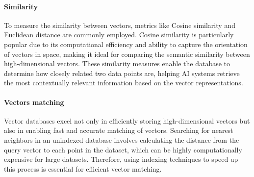 \paragraph*{Similarity}
To measure the similarity between vectors, metrics like Cosine similarity and Euclidean distance are commonly employed.
Cosine similarity is particularly popular due to its computational efficiency and ability to capture the orientation of vectors in space, making it ideal for comparing the semantic similarity between high-dimensional vectors. 
These similarity measures enable the database to determine how closely related two data points are, helping AI systems retrieve the most contextually relevant information based on the vector representations.

\paragraph*{Vectors matching}
Vector databases excel not only in efficiently storing high-dimensional vectors but also in enabling fast and accurate matching of vectors. 
Searching for nearest neighbors in an unindexed database involves calculating the distance from the query vector to each point in the dataset, which can be highly computationally expensive for large datasets.
Therefore, using indexing techniques to speed up this process is essential for efficient vector matching.

